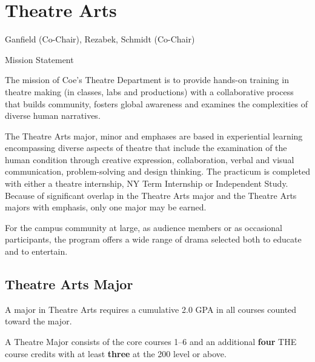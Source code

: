 \documentclass[
  letterpaper,
]{scrbook}
\begin{document}
\section{Theatre Arts}\label{theatre-arts}

Ganfield (Co-Chair), Rezabek, Schmidt (Co-Chair)

Mission Statement

The mission of Coe's Theatre Department is to provide hands-on training
in theatre making (in classes, labs and productions) with a
collaborative process that builds community, fosters global awareness
and examines the complexities of diverse human narratives.

The Theatre Arts major, minor and emphases are based in experiential
learning encompassing diverse aspects of theatre that include the
examination of the human condition through creative expression,
collaboration, verbal and visual communication, problem-solving and
design thinking. The practicum is completed with either a theatre
internship, NY Term Internship or Independent Study. Because of
significant overlap in the Theatre Arts major and the Theatre Arts
majors with emphasis, only one major may be earned.

For the campus community at large, as audience members or as occasional
participants, the program offers a wide range of drama selected both to
educate and to entertain.

\subsection{Theatre Arts Major}\label{theatre-arts-major}

A major in Theatre Arts requires a cumulative 2.0 GPA in all courses
counted toward the major.

A Theatre Major consists of the core courses 1--6 and an additional
\textbf{four} THE course credits with at least \textbf{three} at the 200
level or above.
\end{document}
